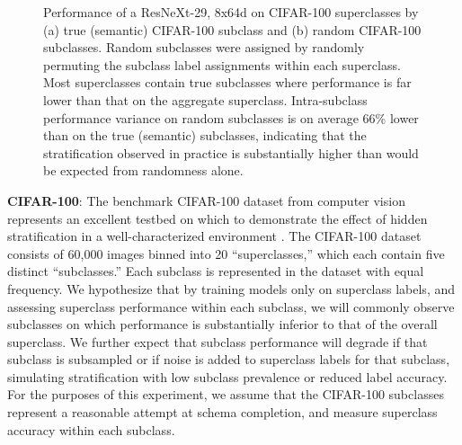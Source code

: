 \documentclass[sigconf]{acmart}
\begin{document}
 \begin{figure*}[htb!]
 \centering
%
\caption{Performance of a ResNeXt-29, 8x64d on CIFAR-100 superclasses by (a) true (semantic) CIFAR-100 subclass and (b) random CIFAR-100 subclasses.  Random subclasses were assigned by randomly permuting the subclass label assignments within each superclass.  Most superclasses contain true subclasses where performance is far lower than that on the aggregate superclass.  Intra-subclass performance variance on random subclasses is on average 66\% lower than on the true (semantic) subclasses, indicating that the stratification observed in practice is substantially higher than would be expected from randomness alone.}
\label{fig:cifar}
\end{figure*}

\textbf{CIFAR-100}: The benchmark CIFAR-100 dataset from computer vision represents an excellent testbed on which to demonstrate the effect of hidden stratification in a well-characterized environment \citep{Krizhevsky2009-tq}.  
The CIFAR-100 dataset consists of 60,000 images binned into 20 ``superclasses,'' which each contain five distinct ``subclasses.'' 
 Each subclass is represented in the dataset with equal frequency.  
 We hypothesize that by training models only on superclass labels, and assessing superclass performance within each subclass, we will commonly observe subclasses on which performance is substantially inferior to that of the overall superclass.  
  We further expect that subclass performance will degrade if that subclass is subsampled or if noise is added to superclass labels for that subclass, simulating stratification with low subclass prevalence or reduced label accuracy.
 For the purposes of this experiment, we assume that the CIFAR-100 subclasses represent a reasonable attempt at schema completion, and measure superclass accuracy within each subclass.
 
\end{document}
